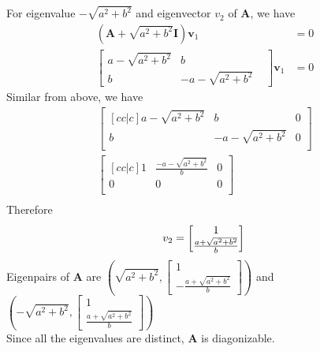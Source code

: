 \documentclass[12pt]{article}
\newcommand{\matr}[1]{\mathbf{#1}}
\begin{document}
For eigenvalue $-\sqrt{a^2+b^2}$ and eigenvector $v_2$ of $\matr A$, we have
\begin{align}
	\left(\matr A+\sqrt{a^2+b^2} \matr I\right) \matr v_1 & = 0 \\
	\begin{bmatrix}
	a - \sqrt{a^{2} + b^{2}} & b                          &   \\
	b                        & - a - \sqrt{a^{2} + b^{2}} &   
	\end{bmatrix} 
	\matr v_1                             & =0  
\end{align}
Similar from above, we have
\begin{align}
	\begin{bmatrix}[cc|c]
	a - \sqrt{a^{2} + b^{2}} & b                                       & 0 \\
	b                        & - a - \sqrt{a^{2} + b^{2}}              & 0 \\
	\end{bmatrix} \\
	\begin{bmatrix}[cc|c]
	1                        & \frac  {-a - \sqrt{a^{2} + b^{2}}}    b & 0 \\
	0                        & 0                                       & 0 \\
	\end{bmatrix} \\
\end{align}
Therefore
\begin{equation}
	v_2=\begin{bmatrix}
	1 \\
	\frac  {a + \sqrt{a^{2} + b^{2}}} b
	\end{bmatrix} \\
\end{equation} 
Eigenpairs of $\matr A$ are $\left(
\sqrt{a^2+b^2},
\begin{bmatrix}
	1                                     \\
	- \frac  {a + \sqrt{a^{2} + b^{2}}} b 
\end{bmatrix}
\right)$ and $\left(
-\sqrt{a^2+b^2},
\begin{bmatrix}
	1                                   \\ 
	\frac  {a + \sqrt{a^{2} + b^{2}}} b 
\end{bmatrix}
\right)$\\
Since all the eigenvalues are distinct, $\matr A$ is diagonizable. \\ \\
\end{document}
